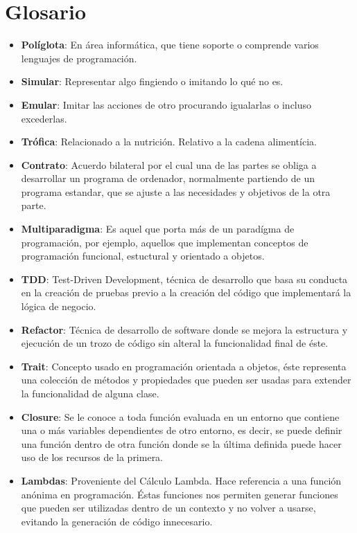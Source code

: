\newpage
\section*{Glosario}
\begin{itemize}  
  \item \textbf{Políglota}: En área informática, que tiene soporte o comprende varios lenguajes de programación.  
  \item \textbf{Simular}: Representar algo fingiendo o imitando lo qué no es.
  \item \textbf{Emular}: Imitar las acciones de otro procurando igualarlas o incluso excederlas.
  \item \textbf{Trófica}: Relacionado a la nutrición. Relativo a la cadena alimentícia.
  \item \textbf{Contrato}: Acuerdo bilateral por el cual una de las partes se obliga a desarrollar un programa de ordenador, normalmente partiendo de un programa estandar, que se ajuste a las necesidades y objetivos de la otra parte.
  \item{\textbf{Multiparadigma}: Es aquel que porta más de un paradígma de programación, por ejemplo, aquellos que implementan conceptos de programación funcional, estuctural y orientado a objetos.}
  \item{\textbf{TDD}: Test-Driven Development, técnica de desarrollo que basa su conducta en la creación de pruebas previo a la creación del código que implementará la lógica de negocio.}
  \item{\textbf{Refactor}: Técnica de desarrollo de software donde se mejora la estructura y ejecución de un trozo de código sin alteral la funcionalidad final de éste.}
  \item{\textbf{Trait}: Concepto usado en programación orientada a objetos, éste representa una colección de métodos y propiedades que pueden ser usadas para extender la funcionalidad de alguna clase.}
  \item{\textbf{Closure}: Se le conoce a toda función evaluada en un entorno que contiene una o más variables dependientes de otro entorno, es decir, se puede definir una función dentro de otra función donde se la última definida puede hacer uso de los recursos de la primera.}
  \item{\textbf{Lambdas}: Proveniente del Cálculo Lambda. Hace referencia a una función anónima en programación. Éstas funciones nos permiten generar funciones que pueden ser utilizadas dentro de un contexto y no volver a usarse, evitando la generación de código innecesario.}
\end{itemize}
